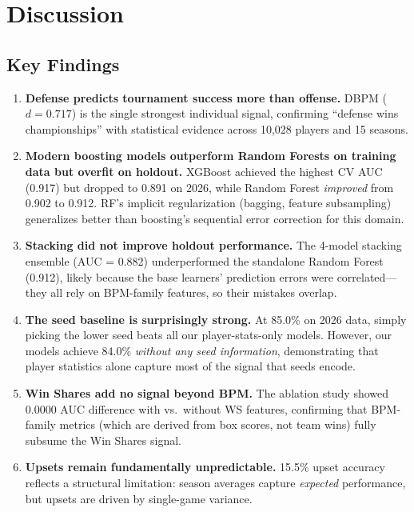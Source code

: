 \documentclass[12pt, a4paper]{article}
\begin{document}
\section{Discussion}
\label{sec:discussion}

\subsection{Key Findings}

\begin{enumerate}
    \item \textbf{Defense predicts tournament success more than offense.} DBPM ($d = 0.717$) is the single strongest individual signal, confirming ``defense wins championships'' with statistical evidence across 10,028 players and 15 seasons.

    \item \textbf{Modern boosting models outperform Random Forests on training data but overfit on holdout.} XGBoost achieved the highest CV AUC (0.917) but dropped to 0.891 on 2026, while Random Forest \textit{improved} from 0.902 to 0.912. RF's implicit regularization (bagging, feature subsampling) generalizes better than boosting's sequential error correction for this domain.

    \item \textbf{Stacking did not improve holdout performance.} The 4-model stacking ensemble (AUC = 0.882) underperformed the standalone Random Forest (0.912), likely because the base learners' prediction errors were correlated---they all rely on BPM-family features, so their mistakes overlap.

    \item \textbf{The seed baseline is surprisingly strong.} At 85.0\% on 2026 data, simply picking the lower seed beats all our player-stats-only models. However, our models achieve 84.0\% \textit{without any seed information}, demonstrating that player statistics alone capture most of the signal that seeds encode.

    \item \textbf{Win Shares add no signal beyond BPM.} The ablation study showed 0.0000 AUC difference with vs.\ without WS features, confirming that BPM-family metrics (which are derived from box scores, not team wins) fully subsume the Win Shares signal.

    \item \textbf{Upsets remain fundamentally unpredictable.} 15.5\% upset accuracy reflects a structural limitation: season averages capture \textit{expected} performance, but upsets are driven by single-game variance.


\end{enumerate}
\end{document}
